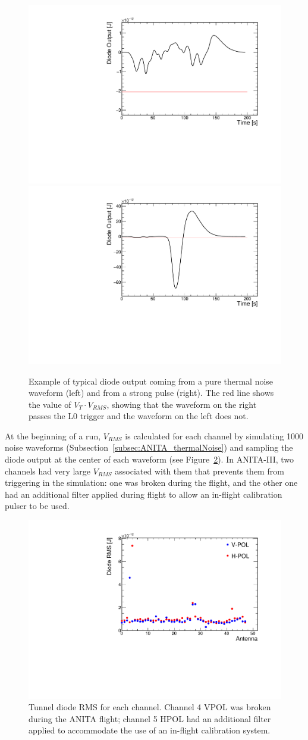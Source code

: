 \begin{figure}[!h]\centering
  \includegraphics[width=.45\linewidth]{./Figs/newnoise_503_0_0_4_diodeOutput.pdf}
  \includegraphics[width=.45\linewidth]{./Figs/newnoise_503_0_0_0_diodeOutput.pdf}
  \caption{Example of typical diode output coming from a pure thermal
    noise waveform (left) and from a strong pulse (right). The red
    line shows the value of $V_T \cdot V_{RMS}$, showing that the
    waveform on the right passes the L0 trigger and the waveform on
    the left does not.}
  \label{fig:ANITA_diodeOutput}
\end{figure}

At the beginning of a run, $V_{RMS}$ is calculated for each channel 
by simulating 1000 noise waveforms
(Subsection~\ref{subsec:ANITA_thermalNoise}) 
and sampling the diode output at the center of each waveform
(see Figure~\ref{fig:ANITA_diodeRMS}).
In ANITA-III, two channels had very large $V_{RMS}$ associated with them that prevents them from triggering in the simulation: one was broken during the flight, and the other one had an additional filter applied during flight to
allow an in-flight calibration pulser to be used.

\begin{figure}[!h]\centering
  \includegraphics[width=.45\linewidth]{./Figs/DiodeRMSfromFile.pdf}
  \caption{Tunnel diode RMS for each channel. Channel 4 VPOL was broken during the ANITA flight; channel 5 HPOL had an additional filter applied to accommodate the use of an in-flight calibration system.}
  \label{fig:ANITA_diodeRMS}
\end{figure}
 
